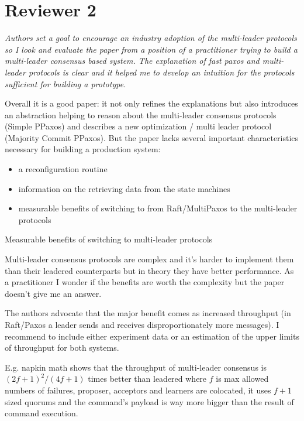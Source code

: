 \documentclass[letterpaper,twocolumn,10pt]{article}
\newenvironment{reviewerquote}
{\list{}{\leftmargin=\parindent\rightmargin=0in}\item[] \itshape \color{ReviewerDarkGray}}%
{\endlist}
\begin{document}
\section*{Reviewer 2}
\begin{reviewerquote}
  Authors set a goal to encourage an industry adoption of the multi-leader
  protocols so I look and evaluate the paper from a position of a practitioner
  trying to build a multi-leader consensus based system. The explanation of
  fast paxos and multi-leader protocols is clear and it helped me to develop an
  intuition for the protocols sufficient for building a prototype.

  Overall it is a good paper: it not only refines the explanations but also
  introduces an abstraction helping to reason about the multi-leader consensus
  protocols (Simple PPaxos) and describes a new optimization / multi leader
  protocol (Majority Commit PPaxos). But the paper lacks several important
  characteristics necessary for building a production system:

  \begin{itemize}
    \item
      a reconfiguration routine
    \item
      information on the retrieving data from the state machines
    \item
      measurable benefits of switching to from Raft/MultiPaxos to the
      multi-leader protocols
  \end{itemize}

  Measurable benefits of switching to multi-leader protocols

  Multi-leader consensus protocols are complex and it's harder to implement
  them than their leadered counterparts but in theory they have better
  performance. As a practitioner I wonder if the benefits are worth the
  complexity but the paper doesn't give me an answer.

  The authors advocate that the major benefit comes as increased throughput (in
  Raft/Paxos a leader sends and receives disproportionately more messages). I
  recommend to include either experiment data or an estimation of the upper
  limits of throughput for both systems.

  E.g. napkin math shows that the throughput of multi-leader consensus is
  $(2f+1)^2/(4f+1)$ times better than leadered where $f$ is max allowed numbers
  of failures, proposer, acceptors and learners are colocated, it uses $f+1$
  sized quorums and the command's payload is way more bigger than the result of
  command execution.


\end{reviewerquote}
\end{document}
